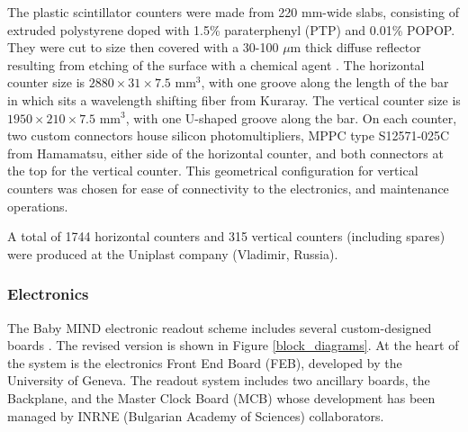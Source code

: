 The plastic scintillator counters were made from 220 mm-wide slabs, consisting of extruded polystyrene doped with 1.5\% paraterphenyl (PTP) and 0.01\% POPOP. They were cut to size then covered with a 30-100 $\mu$m thick diffuse reflector resulting from etching of the surface with a chemical agent \cite{Kudenko:2001qj, Mineev:2011xp}. The horizontal counter size is $2880 \times 31 \times 7.5 $ mm$^3$, with one groove along the length of the bar in which sits a wavelength shifting fiber from Kuraray. The vertical counter size is $1950 \times 210 \times 7.5 $ mm$^3$, with one U-shaped groove along the bar. On each counter, two custom connectors house silicon photomultipliers, MPPC type S12571-025C from Hamamatsu, either side of the horizontal counter, and both connectors at the top for the vertical counter. This geometrical configuration for vertical counters was chosen for ease of connectivity to the electronics, and maintenance operations.

A total of 1744 horizontal counters and 315 vertical counters (including spares) were produced at the Uniplast company (Vladimir, Russia).

\subsubsection{Electronics}
The Baby MIND electronic readout scheme includes several custom-designed boards \cite{Noah:2016ikh}. The revised version is shown in Figure \ref{block_diagrams}. At the heart of the system is the electronics Front End Board (FEB), developed by the University of Geneva. The readout system includes two ancillary boards, the Backplane, and the Master Clock Board (MCB) whose development has been managed by INRNE (Bulgarian Academy of Sciences) collaborators.



